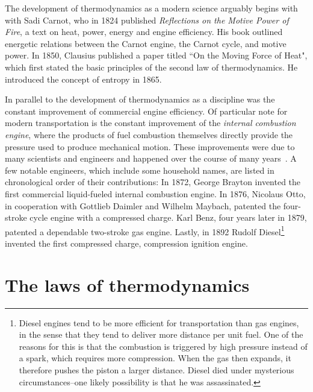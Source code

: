 The development of thermodynamics as a modern science arguably begins with
with Sadi Carnot, who in 1824 published {\it Reflections on the Motive Power of
Fire}, a text on heat, power, energy and engine efficiency. 
His book outlined energetic relations between the
Carnot engine, the Carnot cycle, and motive power. 
In 1850, Clausius published a paper titled ``On the Moving Force of Heat", which 
first stated the basic principles of the second law of thermodynamics. 
He introduced the concept of entropy in 1865.

In parallel to the development of thermodynamics as a discipline was the
constant improvement of commercial engine efficiency. Of particular note for
modern transportation is the constant improvement of the {\it internal
combustion engine}, where the products of fuel
combustion themselves directly provide the pressure used to produce mechanical
motion. These improvements were due to many scientists and engineers and
happened over the course of many years~\cite{wiki:internalCE}.
A few notable engineers, which include some household names, are listed in
chronological order of their contributions:
In 1872, George Brayton invented the first commercial liquid-fueled 
internal combustion engine. In 1876, Nicolaus Otto, in cooperation with Gottlieb 
Daimler and Wilhelm Maybach, patented the four-stroke cycle engine with a 
compressed charge. Karl Benz, four years later in 1879, patented a 
dependable two-stroke gas engine. Lastly, in 1892 Rudolf Diesel\footnote{Diesel
engines tend to be more efficient for transportation 
than gas engines, in the sense that they tend
to deliver more distance per unit fuel. One of the reasons for this is that the
combustion is triggered by high pressure instead of a spark, which requires more
compression. When the gas then expands, it therefore pushes the piston a larger
distance. Diesel died under mysterious circumstances--one likely possibility is that he
was assassinated.} invented the 
first compressed charge, compression ignition engine.


\section{The laws of thermodynamics}

